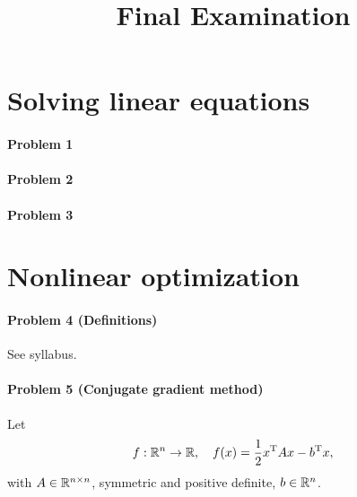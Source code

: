

\usepackage{algpseudocode}

\title{Final Examination}

\newtheorem{algorithm}{Algorithm}


\maketitle

\section*{Solving linear equations}

\paragraph{Problem 1}

\paragraph{Problem 2}
\paragraph{Problem 3}
\section*{Nonlinear optimization}
\paragraph{Problem 4 (Definitions)}
See syllabus.
\paragraph{Problem 5 (Conjugate gradient method)}
Let
\[
    f: \mathbb{R}^n \to \mathbb{R},\quad f(x) = \frac{1}{2} x^{\text{\upshape T}} A x - b^{\text{\upshape T}} x,
\]
with $A\in\mathbb{R}^{n\times n}$, symmetric and positive definite, $b\in\mathbb{R}^n$.

